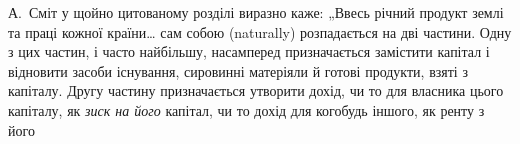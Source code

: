 А.~Сміт у щойно цитованому розділі виразно каже: „Ввесь річний
продукт землі та праці кожної країни\dots{} сам собою (naturally) розпадається
на дві частини. Одну з цих частин, і часто найбільшу, насамперед
призначається замістити капітал і відновити засоби існування, сировинні
матеріяли й готові продукти, взяті з капіталу. Другу частину призначається
утворити дохід, чи то для власника цього капіталу, як \emph{зиск на
його} капітал, чи то дохід для когобудь іншого, як ренту з його
\parbreak{}  %
